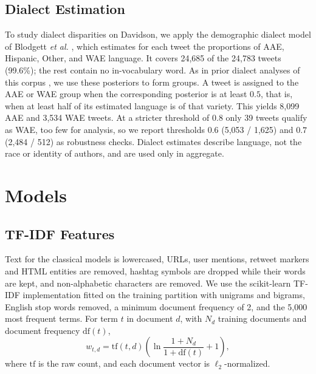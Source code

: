 \documentclass[lettersize,journal]{IEEEtran}
\begin{document}
\subsection{Dialect Estimation}
To study dialect disparities on Davidson, we apply the demographic dialect model of Blodgett \textit{et al.} \cite{blodgett2016demographic}, which estimates for each tweet the proportions of AAE, Hispanic, Other, and WAE language. It covers 24,685 of the 24,783 tweets (99.6\%); the rest contain no in-vocabulary word. As in prior dialect analyses of this corpus \cite{sap2019risk,davidson2019racial}, we use these posteriors to form groups. A tweet is assigned to the AAE or WAE group when the corresponding posterior is at least $0.5$, that is, when at least half of its estimated language is of that variety. This yields 8,099 AAE and 3,534 WAE tweets. At a stricter threshold of $0.8$ only 39 tweets qualify as WAE, too few for analysis, so we report thresholds $0.6$ (5,053 / 1,625) and $0.7$ (2,484 / 512) as robustness checks. Dialect estimates describe language, not the race or identity of authors, and are used only in aggregate.

\section{Models}
\subsection{TF-IDF Features}
Text for the classical models is lowercased, URLs, user mentions, retweet markers and HTML entities are removed, hashtag symbols are dropped while their words are kept, and non-alphabetic characters are removed. We use the scikit-learn \cite{pedregosa2011scikit} TF-IDF implementation fitted on the training partition with unigrams and bigrams, English stop words removed, a minimum document frequency of 2, and the 5,000 most frequent terms. For term $t$ in document $d$, with $N_d$ training documents and document frequency $\mathrm{df}(t)$,
\begin{equation}
w_{t,d} = \mathrm{tf}(t,d)\left(\ln\frac{1+N_d}{1+\mathrm{df}(t)}+1\right),
\end{equation}
where $\mathrm{tf}$ is the raw count, and each document vector is $\ell_2$-normalized.
\end{document}
